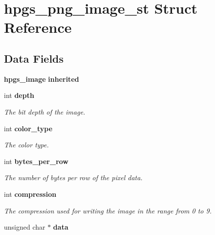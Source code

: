 \section{hpgs\_\-png\_\-image\_\-st Struct Reference}
\label{structhpgs__png__image__st}
\subsection*{Data Fields}
\begin{DoxyCompactItemize}
\item 
{\bf hpgs\_\-image} {\bfseries inherited}\label{structhpgs__png__image__st_a93c5ef188737eafb47010160cc02bc63}

\item 
int {\bf depth}\label{structhpgs__png__image__st_a4c00381dd21833633176f2f0e67a54b4}

\begin{DoxyCompactList}\small\item\em The bit depth of the image. \item\end{DoxyCompactList}\item 
int {\bf color\_\-type}\label{structhpgs__png__image__st_a7aaa33e74655b2a02c70a72c2a37cd7f}

\begin{DoxyCompactList}\small\item\em The color type. \item\end{DoxyCompactList}\item 
int {\bf bytes\_\-per\_\-row}\label{structhpgs__png__image__st_aedf686bfd4e9b6c23b5da9968fa24442}

\begin{DoxyCompactList}\small\item\em The number of bytes per row of the pixel data. \item\end{DoxyCompactList}\item 
int {\bf compression}\label{structhpgs__png__image__st_a1bbc33a309b6bbb1769d011492dfb1db}

\begin{DoxyCompactList}\small\item\em The compression used for writing the image in the range from 0 to 9. \item\end{DoxyCompactList}\item 
unsigned char $\ast$ {\bf data}\label{structhpgs__png__image__st_abdf6d42ab8cc27d1c31156870545fe39}


\end{DoxyCompactItemize}
